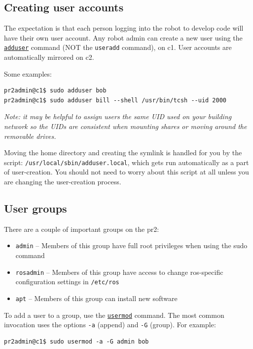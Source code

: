 \subsection{Creating user accounts}
The expectation is that each person logging into the robot to develop
code will have their own user account.  Any robot admin can create a
new user using the
\texttt{\href{http://unixhelp.ed.ac.uk/CGI/man-cgi?adduser}{adduser}}
command (NOT the \texttt{useradd} command), on c1.  User accounts are
automatically mirrored on c2.

Some examples:
\begin{verbatim}
pr2admin@c1$ sudo adduser bob
pr2admin@c1$ sudo adduser bill --shell /usr/bin/tcsh --uid 2000
\end{verbatim}

\textit{Note: it may be helpful to assign users the same UID used on
  your building network so the UIDs are consistent when mounting shares
  or moving around the removable drives.}

Moving the home directory and creating the symlink is handled for you
by the script: \texttt{/usr/local/sbin/adduser.local}, which gets run
automatically as a part of user-creation.  You should not need to
worry about this script at all unless you are changing the
user-creation process.

\subsection{User groups}
There are a couple of important groups on the pr2:
\begin{itemize}
\item \texttt{admin} -- Members of this group have full root privileges when using the sudo command
\item \texttt{rosadmin} -- Members of this group have access to change ros-specific configuration settings in \texttt{/etc/ros}
\item \texttt{apt} -- Members of this group can install new software
\end{itemize}

To add a user to a group, use the
\texttt{\href{http://unixhelp.ed.ac.uk/CGI/man-cgi?usermod}{usermod}}
command.  The most common invocation uses the options \texttt{-a}
(append) and \texttt{-G} (group).  For example:

\begin{verbatim}
pr2admin@c1$ sudo usermod -a -G admin bob
\end{verbatim}

